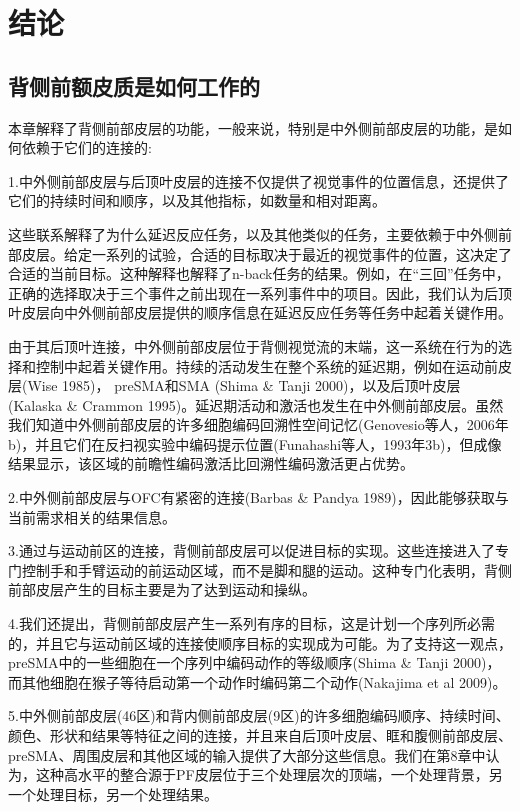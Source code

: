 \section{结论}
\subsection{背侧前额皮质是如何工作的}
本章解释了背侧前部皮层的功能，一般来说，特别是中外侧前部皮层的功能，是如何依赖于它们的连接的:
\par
1.中外侧前部皮层与后顶叶皮层的连接不仅提供了视觉事件的位置信息，还提供了它们的持续时间和顺序，以及其他指标，如数量和相对距离。

这些联系解释了为什么延迟反应任务，以及其他类似的任务，主要依赖于中外侧前部皮层。给定一系列的试验，合适的目标取决于最近的视觉事件的位置，这决定了合适的当前目标。这种解释也解释了n-back任务的结果。例如，在“三回”任务中，正确的选择取决于三个事件之前出现在一系列事件中的项目。因此，我们认为后顶叶皮层向中外侧前部皮层提供的顺序信息在延迟反应任务等任务中起着关键作用。

由于其后顶叶连接，中外侧前部皮层位于背侧视觉流的末端，这一系统在行为的选择和控制中起着关键作用。持续的活动发生在整个系统的延迟期，例如在运动前皮层(Wise 1985)， preSMA和SMA (Shima \& Tanji 2000)，以及后顶叶皮层(Kalaska \& Crammon 1995)。延迟期活动和激活也发生在中外侧前部皮层。虽然我们知道中外侧前部皮层的许多细胞编码回溯性空间记忆(Genovesio等人，2006年b)，并且它们在反扫视实验中编码提示位置(Funahashi等人，1993年3b)，但成像结果显示，该区域的前瞻性编码激活比回溯性编码激活更占优势。
\par
2.中外侧前部皮层与OFC有紧密的连接(Barbas \& Pandya 1989)，因此能够获取与当前需求相关的结果信息。
\par
3.通过与运动前区的连接，背侧前部皮层可以促进目标的实现。这些连接进入了专门控制手和手臂运动的前运动区域，而不是脚和腿的运动。这种专门化表明，背侧前部皮层产生的目标主要是为了达到运动和操纵。
\par
4.我们还提出，背侧前部皮层产生一系列有序的目标，这是计划一个序列所必需的，并且它与运动前区域的连接使顺序目标的实现成为可能。为了支持这一观点，preSMA中的一些细胞在一个序列中编码动作的等级顺序(Shima \& Tanji 2000)，而其他细胞在猴子等待启动第一个动作时编码第二个动作(Nakajima et al 2009)。
\par
5.中外侧前部皮层(46区)和背内侧前部皮层(9区)的许多细胞编码顺序、持续时间、颜色、形状和结果等特征之间的连接，并且来自后顶叶皮层、眶和腹侧前部皮层、preSMA、周围皮层和其他区域的输入提供了大部分这些信息。我们在第8章中认为，这种高水平的整合源于PF皮层位于三个处理层次的顶端，一个处理背景，另一个处理目标，另一个处理结果。

